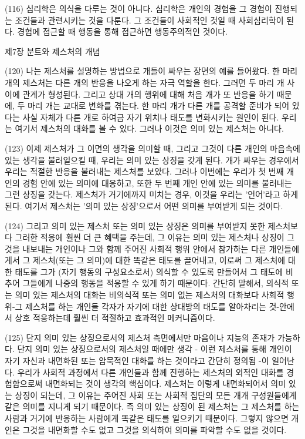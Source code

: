 \documentclass[12pt, a4paper]{article}
\begin{document}
(116) 심리학은 의식을 다루는 것이 아니다. 심리학은 개인의 경험을 그 경험이 진행되는 조건들과 관련시키는 것을 다룬다. 그 조건들이 사회적인 것일 때 사회심리학이 된다. 경험에 접근할 때 행동을 통해 접근하면 행동주의적인 것이다.

제7장 분트와 제스처의 개념

(120) 나는 제스처를 설명하는 방법으로 개들이 싸우는 장면의 예를 들어왔다. 한 마리 개의 제스처는 다른 개의 반응을 나오게 하는 자극 역할을 한다. 그러면 두 마리 개 사이에 관계가 형성된다. 그리고 상대 개의 행위에 대해 처음 개가 또 반응을 하기 때문에, 두 마리 개는 교대로 변화를 겪는다. 한 마리 개가 다른 개를 공격할 준비가 되어 있다는 사실 자체가 다른 개로 하여금 자기 위치나 태도를 변화시키는 원인이 된다. 우리는 여기서 제스처의 대화를 볼 수 있다. 그러나 이것은 의미 있는 제스처는 아니다.

(123) 이제 제스처가 그 이면의 생각을 의미할 때, 그리고 그것이 다른 개인의 마음속에 있는 생각을 불러일으킬 때, 우리는 의미 있는 상징을 갖게 된다. 개가 싸우는 경우에서 우리는 적절한 반응을 불러내는 제스처를 보았다. 그러나 이번에는 우리가 첫 번째 개인의 경험 안에 있는 의미에 대응하고, 또한 두 번째 개인 안에 있는 의미를 불러내는 그런 상징을 갖는다. 제스처가 거기에까지 미치는 경우, 이것을 우리는 '언어'라고 하게 된다. 여기서 제스처는 '의미 있는 상징'으로서 어떤 의미를 부여받게 되는 것이다.

(124) 그리고 의미 있는 제스처 또는 의미 있는 상징은 의미를 부여받지 못한 제스처보다 그러한 적응에 훨씬 더 큰 혜택을 주는데, 그 이유는 의미 있는 제스처나 상징이 그것을 내보내는 개인이나 그와 함께 주어진 사회적 행위 안에서 참가하는 다른 개인들에게서 그 제스처(또는 그 의미)에 대한 똑같은 태도를 끌어내고, 이로써 그 제스처에 대한 태도를 그가 (자기 행동의 구성요소로서) 의식할 수 있도록 만들어서 그 태도에 비추어 그들에게 나중의 행동을 적응할 수 있게 하기 때문이다. 간단히 말해서, 의식적 또는 의미 있는 제스처의 대화는 비의식적 또는 의미 없는 제스처의 대화보다 사회적 행위-그 제스처를 하는 개인들 각자가 자기에 대한 상대방의 태도를 알아차리는 것-안에서 상호 적응하는데 훨씬 더 적절하고 효과적인 메커니즘이다.

(125) 단지 의미 있는 상징으로서의 제스처 측면에서만 마음이나 지능의 존재가 가능하다. 단지 의미 있는 상징으로서의 제스처일 때에만 생각 - 이런 제스처를 통해 개인이 자기 자신과 내면화된 또는 암묵적인 대화를 하는 것이라고 간단히 정의됨 -이 일어난다. 우리가 사회적 과정에서 다른 개인들과 함께 진행하는 제스처의 외적인 대화를 경험함으로써 내면화되는 것이 생각의 핵심이다. 제스처는 이렇게 내면화되어서 의미 있는 상징이 되는데, 그 이유는 주어진 사회 또는 사회적 집단의 모든 개개 구성원들에게 같은 의미를 지니게 되기 때문이다. 즉 의미 있는 상징이 된 제스처는 그 제스처를 하는 사람과 거기에 반응하는 사람에게 똑같은 태도를 일으키기 때문이다. 그렇지 않으면 개인은 그것을 내면화할 수도 없고 그것을 의식하여 의미를 파악할 수도 없을 것이다.
\end{document}
